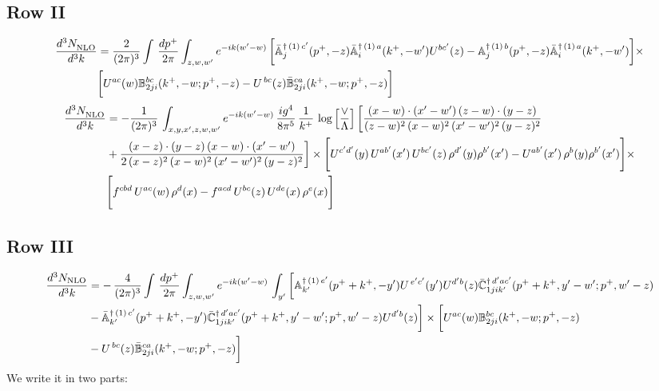 \documentclass[9pt]{article}
\def\mf#1{\mathbb{#1}}
\numberwithin{equation}{section}
\begin{document}
\subsection{{\color{green}Row II}}
\begin{align}
    \frac{d^{3}N_{\rm NLO}^{\rm}}{d^{3}k}  & =    \frac{2}{(2\pi)^{3}} \int\, \frac{dp^{+}}{2\pi}\int_{z,w,w^{\prime}} e^{-ik(w^{\prime}-w)}\,\bigg[\Bar{\mf{A}}^{\dagger\,(1)\, c^{\prime}}_{j}(p^{+},-z)\Bar{\mf{A}}^{\dagger\, (1)\, a}_{i}(k^{+},- w^{\prime})U^{bc^{\prime}}(z) - \mf{A}^{\dagger\, (1)\, b}_{j}(p^{+},- z)\Bar{\mf{A}}^{\dagger\, (1)\, a}_{i}(k^{+},- w^{\prime})\bigg] \times \notag \\ & \bigg[U^{ac}(w) \mf{B}^{bc}_{2ji}(k^{+},-w;p^{+},-z) -U^{\, bc}(z)\Bar{\mf{B}}^{ca}_{2ji}(k^{+},-w; p^{+},-z)\bigg] \nonumber
\end{align}
\begin{align}
 \frac{d^{3}N_{\rm NLO}^{\rm}}{d^{3}k}  & =    -\frac{1}{(2\pi)^{3}}\, \int_{x,y,x',z,w,w^{\prime}} e^{-ik(w^{\prime}-w)}\,\frac{ig^{4}}{8\pi^{5}}\,\frac{1}{k^{+}}\,\log{\left[\frac{\vee}{\Lambda}\right]} \,\bigg[\frac{(x-w)\cdot (x'-w')\,(z-w)\cdot (y-z)}{(z-w)^{2}\,(x-w)^{2}\,(x'-w')^{2}\,(y-z)^{2}}\notag \\ & +\frac{(x-z)\cdot (y-z)\,(x-w)\cdot (x'-w')}{2\,(x-z)^{2}\, (x-w)^{2}\,(x'-w')^{2}\,(y-z)^{2}}\bigg]\times\Bigg[U^{c'd'}(y)\,U^{ab'}(x')\,U^{bc'}(z)\,\rho^{d'}(y)\rho^{b'}(x')-U^{ab'}(x')\,\rho^{b}(y)\rho^{b'}(x')\Bigg]\times\notag \\ & \Bigg[f^{cbd}\,U^{ac}(w)\,\rho^{d}(x)-f^{acd}\, U^{bc}(z)\,U^{de}(x)\,\rho^{e}(x)\Bigg]
\end{align}
 \subsection{{\color{green}Row III}}
 \begin{align}
    \frac{d^{3}N_{\rm NLO}}{d^{3}k} & =   -\,\frac{4}{(2\pi)^{3}} \int\, \frac{dp^{+}}{2\pi}\int_{z,w,w^{\prime}} e^{-ik(w^{\prime}-w)}\,\int_{y^{\prime}}\bigg[\mf{A}^{\dagger\, (1)\,e^{\prime}}_{k^{\prime}}(p^{+}+k^{+},-y^{\prime})U^{\, e^{\prime}c^{\prime}}(y^{\prime})U^{d^{\prime}b}(z) \Bar{\mf{C}}^{\dagger\, d^{\prime}ac^{\prime}}_{1jik^{\prime}}(p^{+}+k^{+},y^{\prime}-w^{\prime}; p^{+},w^{\prime}-z)\notag \\ &  -\Bar{\mf{A}}^{\dagger\, (1)\,c^{\prime}}_{k^{\prime}}(p^{+}+k^{+},-y^{\prime}) \Bar{\mf{C}}^{\dagger\, d^{\prime}ac^{\prime}}_{1jik^{\prime}}(p^{+}+k^{+},y^{\prime}-w^{\prime}; p^{+},w^{\prime}-z)U^{d^{\prime}b}(z)\bigg] \times \bigg[U^{ac}(w) \mf{B}^{bc}_{2ji}(k^{+},-w;p^{+},-z)\notag \\ &  -U^{\, bc}(z)\Bar{\mf{B}}^{ca}_{2ji}(k^{+},-w; p^{+},-z)\bigg]\nonumber
\end{align}
We write it in two parts:
\end{document}
